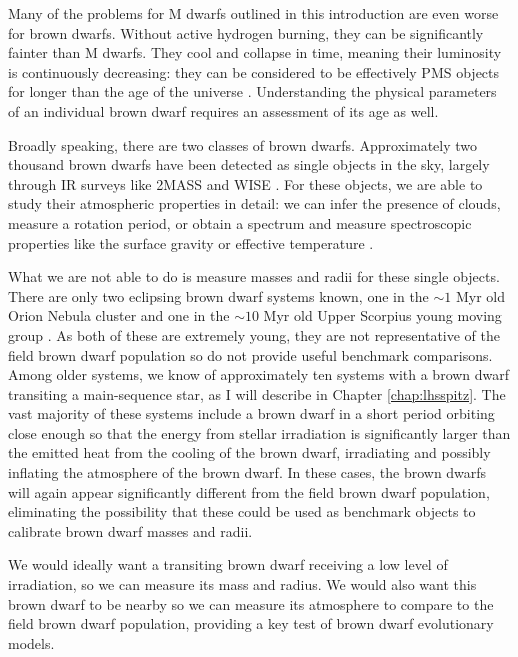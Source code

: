 Many of the problems for M dwarfs outlined in this introduction are even worse for
brown dwarfs.
Without active hydrogen burning, they can be significantly fainter than M dwarfs.
They cool and collapse in time, meaning their luminosity is continuously decreasing:
they can be considered to be effectively PMS objects for longer than the age of the 
universe \citep{Burrows01}.
Understanding the physical parameters of an individual brown dwarf requires an assessment of its age as well.

Broadly speaking, there are two classes of brown dwarfs.
Approximately two thousand brown dwarfs have been detected as single objects in the sky,
largely through IR surveys like 2MASS and WISE \citep[e.g.][]{Kirkpatrick99, Kirkpatrick11}.
For these objects, we are able to study their atmospheric properties in detail: we can 
infer the presence of clouds, measure a rotation period, or obtain a spectrum and measure
spectroscopic properties like the surface gravity or effective temperature \citep[e.g.][]{Faherty14, Filippazzo15}. 

What we are not able to do is measure masses and radii for these single objects.
There are only two eclipsing brown dwarf systems known, one in the $\sim 1$ Myr old Orion
Nebula cluster and one in the $\sim 10$ Myr old Upper Scorpius young moving group
\citep{Stassun06, David16}.
As both of these are extremely young, they are not representative of the field brown dwarf
population so do not provide useful benchmark comparisons.
Among older systems, we know of approximately ten systems with a brown dwarf transiting a main-sequence star, as I will describe in Chapter \ref{chap:lhsspitz}.
The vast majority of these systems include a brown dwarf in a short period orbiting
close enough so that the energy from stellar irradiation is significantly larger than
the emitted heat from the cooling of the brown dwarf, irradiating and possibly inflating
the atmosphere of the brown dwarf.
In these cases, the brown dwarfs will again appear significantly different from the field
brown dwarf population, eliminating the possibility that these could be used as benchmark
objects to calibrate brown dwarf masses and radii.


We would ideally want a transiting brown dwarf receiving a low level of irradiation,
so we can measure its mass and radius.
We would also want this brown dwarf to be nearby so we can measure its atmosphere to
compare to the field brown dwarf population, providing a key test of brown dwarf
evolutionary models.

